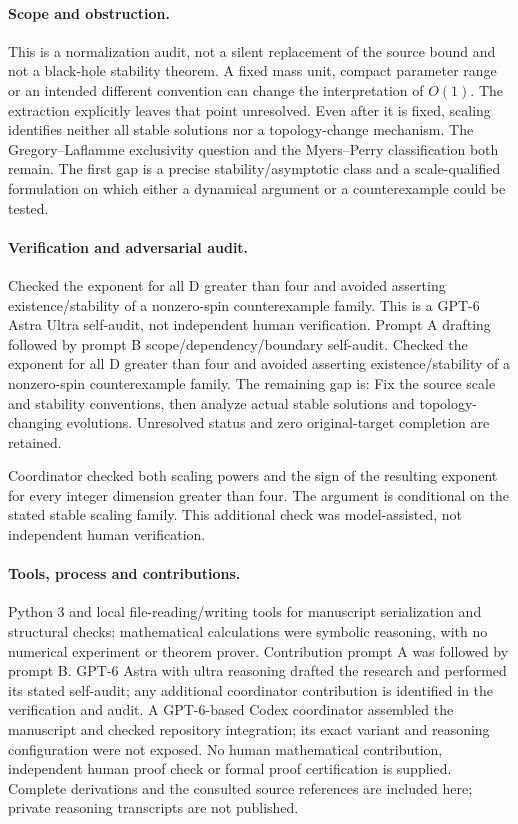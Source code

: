 \documentclass[11pt]{article}
\begin{document}
\paragraph{Scope and obstruction.} This is a normalization audit, not a silent replacement of the source bound and not a black-hole stability theorem. A fixed mass unit, compact parameter range or an intended different convention can change the interpretation of \(O(1)\). The extraction explicitly leaves that point unresolved. Even after it is fixed, scaling identifies neither all stable solutions nor a topology-change mechanism. The Gregory--Laflamme exclusivity question and the Myers--Perry classification both remain. The first gap is a precise stability/asymptotic class and a scale-qualified formulation on which either a dynamical argument or a counterexample could be tested.

\paragraph{Verification and adversarial audit.}
Checked the exponent for all D greater than four and avoided asserting existence/stability of a nonzero-spin counterexample family. This is a GPT-6 Astra Ultra self-audit, not independent human verification. Prompt A drafting followed by prompt B scope/dependency/boundary self-audit. Checked the exponent for all D greater than four and avoided asserting existence/stability of a nonzero-spin counterexample family. The remaining gap is: Fix the source scale and stability conventions, then analyze actual stable solutions and topology-changing evolutions. Unresolved status and zero original-target completion are retained.

Coordinator checked both scaling powers and the sign of the resulting exponent for every integer dimension greater than four. The argument is conditional on the stated stable scaling family. This additional check was model-assisted, not independent human verification.

\paragraph{Tools, process and contributions.}
Python 3 and local file-reading/writing tools for manuscript serialization and structural checks; mathematical calculations were symbolic reasoning, with no numerical experiment or theorem prover. Contribution prompt A was followed by prompt B. GPT-6 Astra with ultra reasoning drafted the research and performed its stated self-audit; any additional coordinator contribution is identified in the verification and audit. A GPT-6-based Codex coordinator assembled the manuscript and checked repository integration; its exact variant and reasoning configuration were not exposed. No human mathematical contribution, independent human proof check or formal proof certification is supplied. Complete derivations and the consulted source references are included here; private reasoning transcripts are not published.
\end{document}
